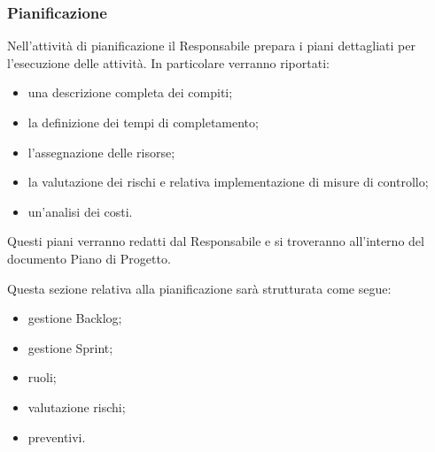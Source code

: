     \subsubsection{Pianificazione}\label{sec:planning}
        Nell'attività di pianificazione il Responsabile prepara i piani dettagliati per l'esecuzione delle attività. In particolare verranno riportati:
        \begin{itemize}
            \item una descrizione completa dei compiti;
            \item la definizione dei tempi di completamento;
            \item l'assegnazione delle risorse;
            \item la valutazione dei rischi e relativa implementazione di misure di controllo;
            \item un'analisi dei costi.
        \end{itemize} 
        Questi piani verranno redatti dal Responsabile e si troveranno all'interno del documento Piano di Progetto.
        
        \vspace{0.3cm}
        \noindent
        Questa sezione relativa alla pianificazione sarà strutturata come segue:
        \begin{itemize}
            \item gestione Backlog;
            \item gestione Sprint;
            \item ruoli;
            \item valutazione rischi;
            \item preventivi.
        \end{itemize}


